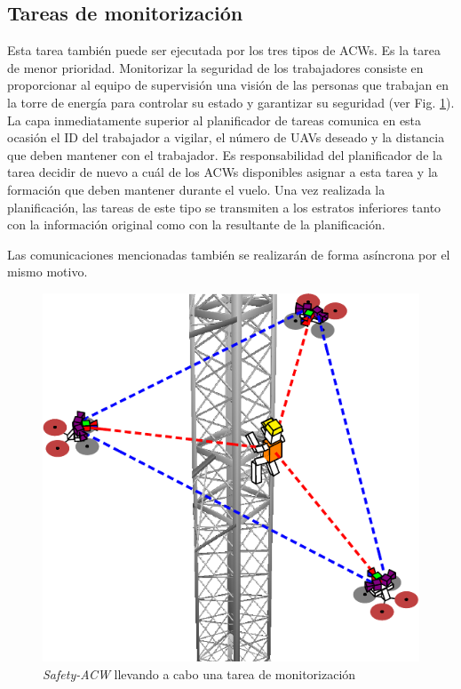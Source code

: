 \documentclass[fontsize=11pt, English=false, Español=true, Myfinal=true, twoside, numbers=noenddot]{scrbook}
\begin{document}
{\subsection{Tareas de monitorización}
\label{subsec:MonitoringTasks}
Esta tarea también puede ser ejecutada por los tres tipos de \glspl{ACW}. Es la tarea de menor prioridad. Monitorizar la seguridad de los trabajadores consiste en proporcionar al equipo de supervisión una visión de las personas que trabajan en la torre de energía para controlar su estado y garantizar su seguridad (ver Fig. \ref{fig:monitor_task}). La capa inmediatamente superior al planificador de tareas comunica en esta ocasión el \gls{ID} del trabajador a vigilar, el número de \glspl{UAV} deseado y la distancia que deben mantener con el trabajador. Es responsabilidad del planificador de la tarea decidir de nuevo a cuál de los \glspl{ACW} disponibles asignar a esta tarea y la formación que deben mantener durante el vuelo. Una vez realizada la planificación, las tareas de este tipo se transmiten a los estratos inferiores tanto con la información original como con la resultante de la planificación.

Las comunicaciones mencionadas también se realizarán de forma asíncrona por el mismo motivo. 

\begin{figure}[htbp]
    \centering
    \includegraphics[width=0.5\linewidth]
    {ProblemFormulation/figures/monitor_task.pdf}
    \caption{\textit{Safety-ACW} llevando a cabo una tarea de monitorización}
    \label{fig:monitor_task}
\end{figure}

}
\end{document}
